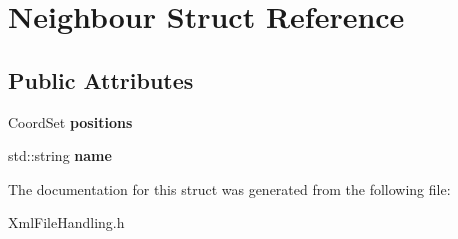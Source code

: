 \hypertarget{structNeighbour}{
\section{Neighbour Struct Reference}
\label{structNeighbour}
}
\subsection*{Public Attributes}
\begin{DoxyCompactItemize}
\item 
\hypertarget{structNeighbour_a136bbd389de0f83ee837f790128c976c}{
CoordSet {\bfseries positions}}
\label{structNeighbour_a136bbd389de0f83ee837f790128c976c}

\item 
\hypertarget{structNeighbour_ac53c620b5efef290cf8bdc2474353243}{
std::string {\bfseries name}}
\label{structNeighbour_ac53c620b5efef290cf8bdc2474353243}

\end{DoxyCompactItemize}


The documentation for this struct was generated from the following file:\begin{DoxyCompactItemize}
\item 
XmlFileHandling.h\end{DoxyCompactItemize}
